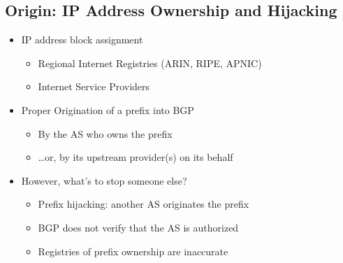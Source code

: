 \subsection{Origin: IP Address Ownership and Hijacking}
\begin{itemize}[nosep]
    \item IP address block assignment
          \begin{itemize}[nosep]
              \item Regional Internet Registries (ARIN, RIPE, APNIC)
              \item Internet Service Providers
          \end{itemize}
    \item Proper Origination of a prefix into BGP
          \begin{itemize}[nosep]
              \item By the AS who owns the prefix
              \item \dots or, by its upstream provider(s) on its behalf
          \end{itemize}
    \item However, what's to stop someone else?
          \begin{itemize}[nosep]
              \item Prefix hijacking: another AS originates the prefix
              \item BGP does not verify that the AS is authorized
              \item Registries of prefix ownership are inaccurate
          \end{itemize}
\end{itemize}

